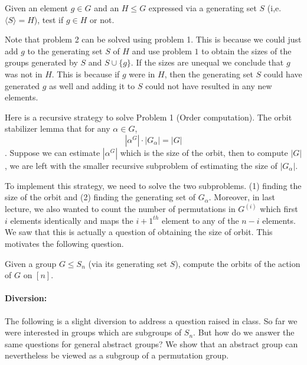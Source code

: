 \begin{problem}
	Given an element  $g \in G$ and an $H \le G$ expressed via a
	generating set $S$ (i,e. $\langle S \rangle = H$), test if $g \in H$
	or not.
\end{problem}

Note that problem 2 can be solved using problem 1. This is because we could just add $g$ to the generating set $S$ of $H$ and use problem $1$ to obtain the sizes of the groups generated by $S$ and $S \cup \{g\}$. If the sizes are
unequal we conclude that $g$ was not in $H$. This is because if $g$ were in
$H$, then the generating set $S$ could have generated $g$ as well and adding
it to $S$ could not have resulted in any new elements.  

Here is a recursive strategy to solve Problem 1 (Order computation). The orbit stabilizer lemma that for any $\alpha \in  G$, $$|\alpha^{G}|\cdot |G_{\alpha}| = |G|$$. Suppose we can estimate $|\alpha^{G}|$ which is the size of the orbit, then to compute $|G|$, we are left with the smaller recursive subproblem of estimating the size of $|G_{\alpha}|$. 

To implement this strategy, we need to solve the two subproblems. (1) finding the size of the orbit and (2) finding the generating set of $G_\alpha$. Moreover, in last lecture, we also wanted to count the number of permutations in $G^{(i)}$ which first $i$ elements identically and maps the $i+1^{th}$ element
to any of the $n-i$ elements. We saw that this is actually a question of obtaining the size of orbit. This motivates the following question.

\begin{problem} 
Given a group $G \le S_{n}$ (via its generating set $S$), compute the orbits of the action of $G$ on $[n]$.
\end{problem}

\paragraph{Diversion:}
The following is a slight diversion to address a question raised in class. So far we were interested in groups which are subgroups of $S_n$. But how do we answer the same questions for general abstract groups? We show that an abstract group can nevertheless be viewed as a subgroup of a permutation group. 


